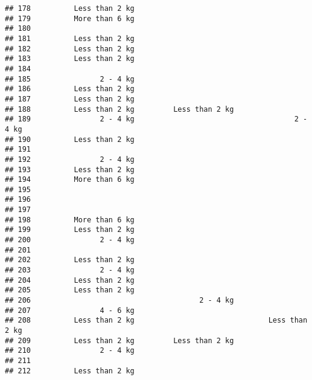 \documentclass[
]{article}
\begin{document}
\begin{verbatim}
## 178          Less than 2 kg                                             
## 179          More than 6 kg                                             
## 180                                                                     
## 181          Less than 2 kg                                             
## 182          Less than 2 kg                                             
## 183          Less than 2 kg                                             
## 184                                                                     
## 185                2 - 4 kg                                             
## 186          Less than 2 kg                                             
## 187          Less than 2 kg                                             
## 188          Less than 2 kg         Less than 2 kg                      
## 189                2 - 4 kg                                     2 - 4 kg
## 190          Less than 2 kg                                             
## 191                                                                     
## 192                2 - 4 kg                                             
## 193          Less than 2 kg                                             
## 194          More than 6 kg                                             
## 195                                                                     
## 196                                                                     
## 197                                                                     
## 198          More than 6 kg                                             
## 199          Less than 2 kg                                             
## 200                2 - 4 kg                                             
## 201                                                                     
## 202          Less than 2 kg                                             
## 203                2 - 4 kg                                             
## 204          Less than 2 kg                                             
## 205          Less than 2 kg                                             
## 206                                       2 - 4 kg                      
## 207                4 - 6 kg                                             
## 208          Less than 2 kg                               Less than 2 kg
## 209          Less than 2 kg         Less than 2 kg                      
## 210                2 - 4 kg                                             
## 211                                                                     
## 212          Less than 2 kg                                             

\end{verbatim}
\end{document}
